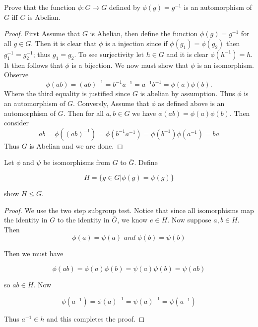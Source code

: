 \documentclass[11pt,largemargins]{homework}
\begin{document}
\maketitle

\question
Prove that the function $\phi : G \to G$ defined by $\phi (g) = g^{-1}$ is an automorphism of 
$G$ iff $G$ is Abelian. 

\begin{proof}
    First Assume that $G$ is Abelian, then define the function $\phi(g) = g^{-1}$ for all $g \in G$. Then it is clear that $\phi$ is 
    a injection since if $\phi(g_1) = \phi(g_2)$ then $g_1^{-1} = g_2^{-1}$; thus $g_1 = g_2$. To see surjectivity let $h \in G$ and it 
    is clear $\phi(h^{-1}) = h$. It then follows that $\phi$ is a bijection. We now must show that $\phi$ is an isomorphism. Observe 
    \[ \phi(ab) = (ab)^{-1} = b^{-1}a^{-1} = a^{-1}b^{-1} = \phi(a)\phi(b). \]  
    Where the third equality is justified since $G$ is abelian by assumption. Thus $\phi$ is an automorphism of $G$.  
    Conversly, Assume that $\phi$ as defined above is an automorphism of $G$. Then for all $a, b \in G$ we have $\phi(ab) = \phi(a)\phi(b)$. 
    Then consider 
    \[ ab = \phi((ab)^{-1}) = \phi(b^{-1}a^{-1}) = \phi(b^{-1})\phi(a^{-1}) = ba \]
    Thus $G$ is Abelian and we are done. 
    
\end{proof}

\question 
Let $\phi$ and $\psi$ be isomorphisms from $G$ to $\bar{G}$. Define 

\[H = \{ g \in G | \phi(g) = \psi(g) \}\]

show $H \leq G$. 

\begin{proof}
We use the two step subgroup test. Notice that since all isomorphisms map the identity in $G$ to the identity in $\bar{G}$, we know 
$e \in H$. Now suppose $a, b \in H$. Then 
\[\phi(a) = \psi(a) \textit{ and } \phi(b) = \psi(b)\]

Then we must have 

\[ \phi(ab) = \phi(a)\phi(b) = \psi(a)\psi(b) = \psi(ab)\]

so $ab \in H$. Now

\[ \phi(a^{-1}) = \phi(a)^{-1} = \psi(a)^{-1} = \psi(a^{-1}) \] 

Thus $a^{-1} \in h$ and this completes the proof. 


    
\end{proof}
\end{document}
